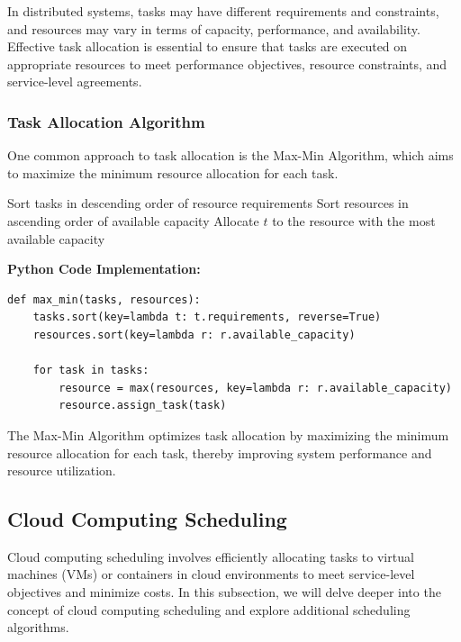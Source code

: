 \documentclass[12pt]{book} %
\begin{document}
In distributed systems, tasks may have different requirements and constraints, and resources may vary in terms of capacity, performance, and availability. Effective task allocation is essential to ensure that tasks are executed on appropriate resources to meet performance objectives, resource constraints, and service-level agreements.

\subsubsection{Task Allocation Algorithm}

One common approach to task allocation is the Max-Min Algorithm, which aims to maximize the minimum resource allocation for each task.
\FloatBarrier
\begin{algorithm}[H]
\caption{Max-Min Algorithm}\label{alg:max_min}
\begin{algorithmic}[1]
\State Sort tasks in descending order of resource requirements
\State Sort resources in ascending order of available capacity
    \State Allocate $t$ to the resource with the most available capacity
\EndFor
\EndProcedure
\end{algorithmic}
\end{algorithm}
\FloatBarrier   
\textbf{Python Code Implementation:}
\FloatBarrier
\begin{lstlisting}
def max_min(tasks, resources):
    tasks.sort(key=lambda t: t.requirements, reverse=True)
    resources.sort(key=lambda r: r.available_capacity)
    
    for task in tasks:
        resource = max(resources, key=lambda r: r.available_capacity)
        resource.assign_task(task)
\end{lstlisting}
\FloatBarrier
The Max-Min Algorithm optimizes task allocation by maximizing the minimum resource allocation for each task, thereby improving system performance and resource utilization.

\subsection{Cloud Computing Scheduling}

Cloud computing scheduling involves efficiently allocating tasks to virtual machines (VMs) or containers in cloud environments to meet service-level objectives and minimize costs. In this subsection, we will delve deeper into the concept of cloud computing scheduling and explore additional scheduling algorithms.
\end{document}
